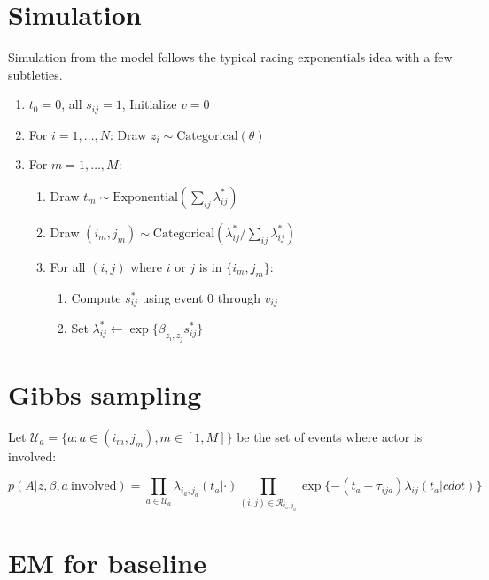 \documentclass[11pt]{article}
\begin{document}
\appendix
\section{Simulation}

Simulation from the model follows the typical racing exponentials idea with a few subtleties.

\begin{enumerate}
\item $t_0 = 0$, all $s_{ij} = 1$, Initialize $v = 0$
\item For $i = 1, \ldots, N$: Draw $z_i \sim \mbox{Categorical}(\theta)$
\item For $m = 1, \ldots, M$:
  \begin{enumerate}
  \item Draw $t_m \sim \mbox{Exponential}\left(\sum_{ij} \lambda_{ij}^*\right)$
  \item Draw $(i_m,j_m) \sim \mbox{Categorical}\left(\lambda_{ij}^* / \sum_{ij}\lambda_{ij}^*\right)$
  \item For all $(i,j)$ where $i$ or $j$ is in $\{i_m,j_m\}$:
    \begin{enumerate}
    \item Compute $s_{ij}^*$ using event $0$ through $v_{ij}$
    \item Set $\lambda_{ij}^* \leftarrow \exp\{ \beta_{z_i,z_j} s_{ij}^*\}$ 
    \end{enumerate}
  \end{enumerate}
\end{enumerate}

\section{Gibbs sampling}

Let $\mathcal{U}_a = \{a: a \in (i_m,j_m), m \in [1,M]\}$ be the set of events where actor is involved:

$$p(A|z,\beta,a \ \mbox{involved}) = \prod_{a \in \mathcal{U}_a} \lambda_{i_a,j_a}(t_a|\cdot)
\prod_{(i,j) \in \mathcal{R}_{i_a,j_a}} \exp \{ -(t_a - \tau_{ija}) \lambda_{ij}(t_a|cdot)\}$$

\section{EM for baseline}
\end{document}
